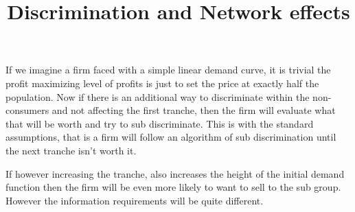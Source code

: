 \documentclass{article}
\begin{document}
\title{Discrimination and Network effects}

If we imagine a firm faced with a simple linear demand curve, it is trivial the profit maximizing level of profits is just to set the price at exactly half the population. Now if there is an additional way to discriminate within the non-consumers and not affecting the first tranche, then the firm will evaluate what that will be worth and try to sub discriminate. This is with the standard assumptions, that is a firm will follow an algorithm of sub discrimination until the next tranche isn't worth it. 

If however increasing the tranche, also increases the height of the initial demand function then the firm will be even more likely to want to sell to the sub group. However the information requirements will be quite different. 
\end{document}
